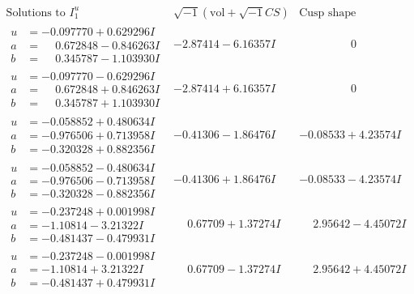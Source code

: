 \documentclass[1p]{elsarticle_modified}
\theoremstyle{definition}
\newcommand{\I}{\sqrt{-1}}
\begin{document}
$$\begin{array}{c|c|c}
 \end{array}$$\newpage$$\begin{array}{c|c|c}  
\text{Solutions to }I^u_{1}& \I (\text{vol} + \sqrt{-1}CS) & \text{Cusp shape}\\
 \hline 
\begin{aligned}
u &= -0.097770 + 0.629296 I \\
a &= \phantom{-}0.672848 - 0.846263 I \\
b &= \phantom{-}0.345787 - 1.103930 I\end{aligned}
 & -2.87414 - 6.16357 I & \phantom{-0.000000 } 0 \\ \hline\begin{aligned}
u &= -0.097770 - 0.629296 I \\
a &= \phantom{-}0.672848 + 0.846263 I \\
b &= \phantom{-}0.345787 + 1.103930 I\end{aligned}
 & -2.87414 + 6.16357 I & \phantom{-0.000000 } 0 \\ \hline\begin{aligned}
u &= -0.058852 + 0.480634 I \\
a &= -0.976506 + 0.713958 I \\
b &= -0.320328 + 0.882356 I\end{aligned}
 & -0.41306 - 1.86476 I & -0.08533 + 4.23574 I \\ \hline\begin{aligned}
u &= -0.058852 - 0.480634 I \\
a &= -0.976506 - 0.713958 I \\
b &= -0.320328 - 0.882356 I\end{aligned}
 & -0.41306 + 1.86476 I & -0.08533 - 4.23574 I \\ \hline\begin{aligned}
u &= -0.237248 + 0.001998 I \\
a &= -1.10814 - 3.21322 I \\
b &= -0.481437 - 0.479931 I\end{aligned}
 & \phantom{-}0.67709 + 1.37274 I & \phantom{-}2.95642 - 4.45072 I \\ \hline\begin{aligned}
u &= -0.237248 - 0.001998 I \\
a &= -1.10814 + 3.21322 I \\
b &= -0.481437 + 0.479931 I\end{aligned}
 & \phantom{-}0.67709 - 1.37274 I & \phantom{-}2.95642 + 4.45072 I \\ \hline\begin{aligned}

\end{aligned}
\end{array}$$
\end{document}
